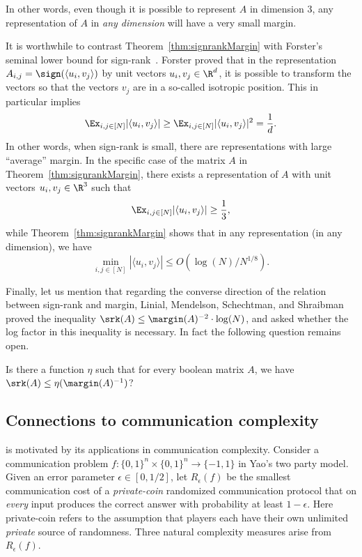 In other words, even though it is possible to represent $A$ in dimension $3$, any representation of $A$ in \emph{any dimension} will have a very small margin.

It is worthwhile to contrast Theorem~\ref{thm:signrankMargin} with  Forster's seminal lower bound for sign-rank~\cite{forster2002linear}. Forster proved that in the representation $A_{i,j}=\sign(\langle u_i,v_j \rangle)$ by unit vectors $u_i,v_j \in \R^d$, it is possible to transform the vectors  so that the vectors $v_j$ are in a so-called isotropic position. This in particular implies 
$$\Ex_{i,j \in [N]} |\langle u_i,v_j\rangle| \ge \Ex_{i,j \in [N]} |\langle u_i,v_j\rangle|^2 = \frac{1}{d}.$$
In other words, when sign-rank is small, there are representations with large ``average'' margin. In the specific case of the matrix $A$ in Theorem~\ref{thm:signrankMargin}, there exists a representation of $A$ with unit vectors $u_i,v_j \in \R^3$ such that 
$$\Ex_{i,j \in [N]} |\langle u_i,v_j\rangle| \ge \frac{1}{3},$$
while Theorem~\ref{thm:signrankMargin} shows that in any  representation (in any dimension), we have
$$\min_{i,j \in [N]} |\langle u_i,v_j\rangle| \le O(\log(N)/N^{1/8}).$$

Finally, let us mention that regarding the converse direction of the relation between sign-rank and margin, Linial, Mendelson, Schechtman, and Shraibman~\cite[Corollary 3.2, Lemma 4.2, and Section 8]{MR2359826}  proved the inequality $\srk(A) \le \margin(A)^{-2} \cdot \log(N)$, and asked whether the log factor in this inequality is necessary. In fact the following question remains open. 
\begin{question} 
Is there a function $\eta$ such that for every boolean matrix $A$, we have $\srk(A)\leq \eta(\margin(A)^{-1})$? 
\end{question}





\subsection{Connections to communication complexity}

 is  motivated by its applications in communication complexity.  Consider a communication problem $f:\{0,1\}^n \times \{0,1\}^n \to \{-1,1\}$ in Yao's two party model. Given an error parameter  $\epsilon \in [0,1/2]$, let $R_{\epsilon}(f)$  be the smallest communication cost of a \emph{private-coin} randomized communication protocol that  on \emph{every} input produces the correct answer  with   probability at least  $1-\epsilon$.  Here private-coin refers to the assumption that  players each have their own unlimited \emph{private} source of randomness.   Three natural complexity measures arise from $R_{\epsilon}(f)$.

